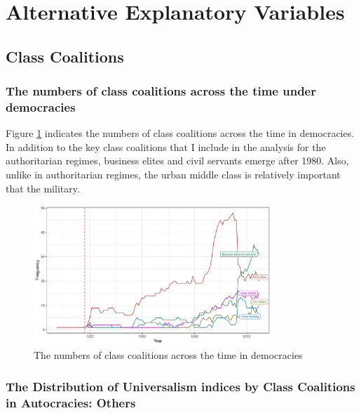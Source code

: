\documentclass[12pt]{article}
\begin{document}
	\section{Alternative Explanatory Variables}
	\subsection{Class Coalitions}
	\subsubsection{The numbers of class coalitions across the time under democracies}
	Figure \ref{fig:figure7} indicates the numbers of class coalitions across the time in democracies. In addition to the key class coalitions that I include in the analysis for the authoritarian regimes, business elites and civil servants emerge after 1980. Also, unlike in authoritarian regimes, the urban middle class is relatively important that the military.
	
	\begin{figure}[!ht]
		\centering
		\includegraphics[width=0.8\textwidth]{"2_Figures/Appendix/Appendix3_trenddem"}
		\caption{The numbers of class coalitions across the time in democracies}
		\label{fig:figure7}
	\end{figure}
	
	\subsubsection{The Distribution of Universalism indices by Class Coalitions in Autocracies: Others}
	
\end{document}
